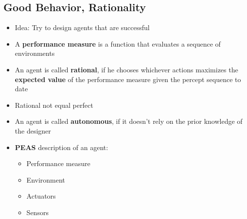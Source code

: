 \documentclass{scrartcl}
\begin{document}
\subsection{Good Behavior, Rationality}
\begin{itemize}
    \item
        Idea: Try to design agents that are successful
    \item
        A \textbf{performance measure} is a function that evaluates a sequence of environments
    \item
        An agent is called \textbf{rational}, if he chooses whichever actions maximizes the \textbf{expected value} of the performance measure given the percept sequence to date
    \item
        Rational not equal perfect
    \item
        An agent is called \textbf{autonomous}, if it doesn't rely on the prior knowledge of the designer 
    \item
        \textbf{PEAS} description of an agent:
        \begin{itemize}
            \item
                Performance measure
            \item
                Environment
            \item
                Actuators
            \item
                Sensors
        \end{itemize}
\end{itemize}
\end{document}

